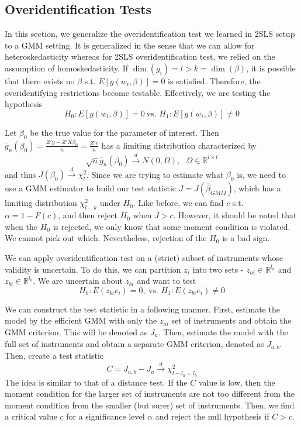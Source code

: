 \documentclass[12pt]{article}
\theoremstyle{definition}
\theoremstyle{property}
\theoremstyle{assumption}
\theoremstyle{example}
\theoremstyle{comment}
\begin{document}
\subsection{Overidentification Tests}
In this section, we generalize the overidentification test we learned in 2SLS setup to a GMM setting. It is generalized in the sense that we can allow for heteroskedasticity whereas for 2SLS overidentification test, we relied on the assumption of homoskedasticity. If $\dim(g_i)=l>k=\dim(\beta)$, it is possible that there exists no $\beta$ s.t. $E[g(w_i,\beta)]=0$ is satisfied. Therefore, the overidentifying restrictions become testable.  Effectively, we are testing the hypothesis
\[
H_0: E[g(w_i,\beta)]=0 \ \text{vs. } H_1: E[g(w_i,\beta)]\neq0
\]\par
Let $\beta_0$ be the true value for the parameter of interest. Then $\bar{g}_n(\beta_0)=\frac{Z'y-Z'X\beta_0}{n}=\frac{Z'e}{n}$ has a limiting distribution characterized by
\[
\sqrt{n}\bar{g}_n(\beta_0) \xrightarrow{d}N(0,\Omega),\ \ \ \Omega\in\mathbb{R}^{l\times l}
\]
and thus $J(\beta_0)\xrightarrow{d}\chi^2_l$. Since we are trying to estimate what $\beta_0$ is, we need to use a GMM estimator to build our test statistic $J=J(\hat{\beta}_{GMM})$, which has a limiting distribution $\chi^2_{l-k}$ under $H_0$. Like before, we can find $c$ s.t. $\alpha=1-F(c)$, and then reject $H_0$ when $J>c$. However, it should be noted that when the $H_0$ is rejected, we only know that some moment condition is violated. We cannot pick out which. Nevertheless, rejection of the $H_0$ is a bad sign. \par
We can apply overidentification test on a (strict) subset of instruments whose validity is uncertain. To do this, we can partition $z_i$ into two sets - $z_{ai}\in\mathbb{R}^{l_a}$ and $z_{bi}\in\mathbb{R}^{l_b}$. We are uncertain about $z_{bi}$ and want to test 
\[
H_0: E(z_{bi}e_i)=0, \ \text{vs. }H_1:E(z_{bi}e_i)\neq0
\]\par
We can construct the test statistic in a following manner. First, estimate the model by the efficient GMM with only the $z_{ai}$ set of instruments and obtain the GMM criterion. This will be denoted as $J_a$. Then, estimate the model with the full set of instruments and obtain a separate GMM criterion, denoted as $J_{a,b}$. Then, create a test statistic
\[
C=J_{a,b}-J_a\xrightarrow{d}\chi^2_{l-l_a=l_b}
\]
The idea is similar to that of a distance test. If the $C$ value is low, then the moment condition for the larger set of instruments are not too different from the moment condition from the smaller (but surer) set of instruments. Then, we find a critical value $c$ for a significance level $\alpha$ and reject the null hypothesis if $C>c$. 
\end{document}
